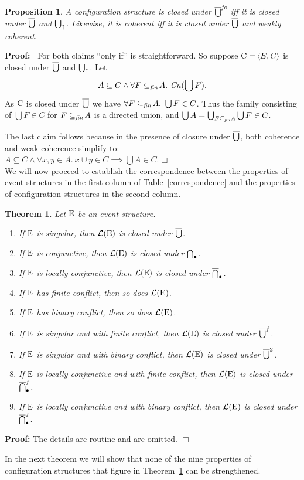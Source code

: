 \documentclass[twocolumn]{article}
\newtheorem{theo}{Theorem}
\newtheorem{prop}{Proposition}[section]
\newenvironment{theorem}[1]{\begin{theo} \rm \label{th-#1} }{\end{theo}}
\newenvironment{proposition}[1]{\begin{prop} \rm \label{pr-#1} }{\end{prop}}
\newenvironment{proof}{\begin{trivlist} \item[\hspace{\labelsep}\bf
Proof:]}{\hfill $\Box$\end{trivlist}}
\newcommand{\thm}[1]{Theorem~\ref{th-#1}}
\newcommand{\pf}{{\bf Proof:\ }}
\begin{document}
\begin{proposition}{no packaging}
A configuration structure is closed under $\overline{\bigcup}^{\it fc}$ iff it
is closed under $\overline{\bigcup}$ and $\bigcup_{\uparrow}$.  Likewise, it is
coherent iff it is closed under $\overline{\bigcup}$ and weakly coherent.
\end{proposition}
\pf
For both claims ``only if'' is straightforward.  So suppose
$\eC=\tuple{E,C}$ is closed under $\overline{\bigcup}$ and $\bigcup_{\uparrow}$.  Let $$A
\subseteq C \wedge \forall F\subseteq_{\it fin}\!A.~{\it Cn}(\bigcup F).$$
As ${\rm C}$ is closed under $\overline{\bigcup}$ we have $\forall F\subseteq_{\it
fin}\!A.~\bigcup F \in C$. Thus the family consisting of $\bigcup F\in C$
for $F\subseteq_{\it fin}\!A$ is a directed union, and $\bigcup A =
\bigcup_{F\subseteq_{\it fin}A} \bigcup F \in C$.

The last claim follows because in the presence of closure under
$\overline{\bigcup}$, both coherence and weak coherence simplify to:\\[1ex]
\mbox{}\hfill$A \subseteq C \wedge \forall x,y\!\in\! A.~ x \cup y \in
C \implies \bigcup A \in C$.\hfill$\Box$\\[1em]
We will now proceed to establish the correspondence between the
properties of event structures in the first column of
Table~\ref{correspondence} and the properties of configuration
structures in the second column.

\begin{theorem}{EtoC} Let ${\rm E}$ be an event structure.
\begin{enumerate}
\item If ${\rm E}$ is singular, then ${\cal L}({\rm E})$ is closed under $\overline{\bigcup}$.
\item If ${\rm E}$ is conjunctive, then ${\cal L}({\rm E})$ is closed under $\bigcap_{\bullet}$.
\item If ${\rm E}$ is locally conjunctive, then ${\cal L}({\rm E})$ is closed under
$\overline{\bigcap}_{\bullet}$.
\item If ${\rm E}$ has finite conflict, then so does ${\cal L}({\rm E})$.
\item If ${\rm E}$ has binary conflict, then so does ${\cal L}({\rm E})$.
\item If ${\rm E}$ is singular and with finite conflict, then ${\cal L}({\rm E})$ is
closed under $\overline{\bigcup}^f$.
\item If ${\rm E}$ is singular and with binary conflict, then ${\cal L}({\rm E})$ is
closed under $\overline{\bigcup}^2$.
\item If ${\rm E}$ is locally conjunctive and with finite conflict, then
${\cal L}({\rm E})$ is closed under $\overline{\bigcap}_{\bullet}^f$.
\item If ${\rm E}$ is locally conjunctive and with binary conflict, then
${\cal L}({\rm E})$ is closed under $\overline{\bigcap}_{\bullet}^2$.
\end{enumerate}
\end{theorem}
\begin{proof} The details are routine and are omitted.
\end{proof}
In the next theorem we will show that none of the nine properties of
configuration structures that figure in \thm{EtoC} can be strengthened.
\end{document}
